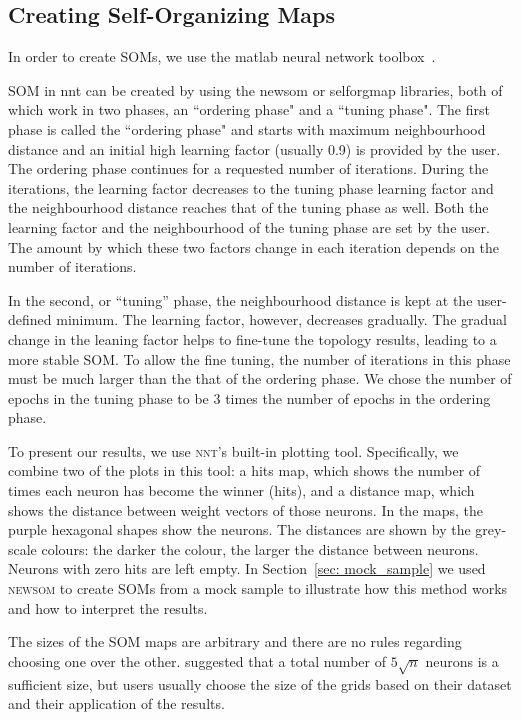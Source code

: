 \subsection{Creating Self-Organizing Maps}
\label{sec: create_som}
     In order to create SOMs, we use the {\sc matlab} neural network toolbox~\citep[NNT,][]{matlabtolbox}.
     
     SOM in {\sc nnt} can be created by using the {\sc newsom} or {\sc selforgmap} libraries, both of which work in two phases, an ``ordering phase" and a ``tuning phase". 
     The first phase is called the ``ordering phase" and
     starts with maximum neighbourhood distance and an initial high learning factor (usually 0.9) is provided by the user. 
     The ordering phase continues for a requested number of iterations.
     During the iterations, the learning factor decreases to the tuning phase learning factor and the neighbourhood distance reaches that of the tuning phase as well.
     Both the learning factor and the neighbourhood of the tuning phase are set by the user. 
     The amount by which these two factors change in each iteration depends on the number of iterations.
     
     In the second, or ``tuning'' phase,
     the neighbourhood distance is kept at the user-defined minimum.
     The learning factor, however, decreases gradually.
     The gradual change in the leaning factor helps to fine-tune the topology results, leading to a more stable SOM. 
     To allow the fine tuning, the number of iterations in this phase must be much larger than the that of the ordering phase.
     We chose the number of epochs in the tuning phase to be 3 times the number of epochs in the ordering phase.
     
     To present our results, we use \textsc{nnt}'s built-in plotting tool.
     Specifically, we combine two of the plots in this tool: a hits map, which shows the number of times each neuron has become the winner (hits), and a distance map, which shows the distance between weight vectors of those neurons.
     In the maps, the purple hexagonal shapes show the neurons. 
     The distances are shown by the grey-scale colours: the darker the colour, the larger the distance between neurons.
     Neurons with zero hits are left empty.
     In Section~\ref{sec: mock_sample} we used \textsc{newsom} to create SOMs from a mock sample to illustrate how this method works and how to interpret the results.
      
    The sizes of the SOM maps are arbitrary and there are no rules regarding choosing one over the other. 
    \citet{Vesanto05} suggested that a total number of $5\sqrt{n}$ neurons is a sufficient size, but users usually choose the size of the grids based on their dataset and their application of the results.

